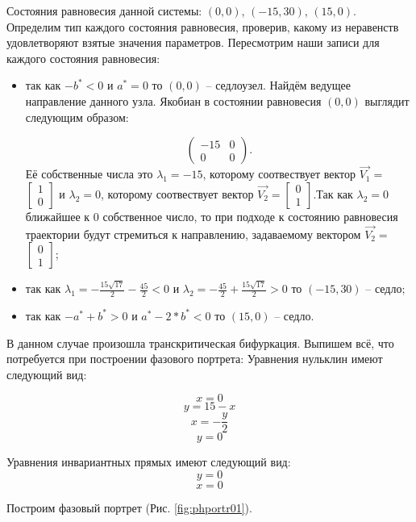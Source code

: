 Состояния равновесия данной системы:  $(0, 0)$, $(-15, 30)$, $(15, 0)$. Определим тип каждого состояния равновесия, проверив, какому из неравенств удовлетворяют взятые значения параметров.  Пересмотрим наши записи для каждого состояния равновесия: 
\begin{itemize}
	\item{ так как $-b^\ast  < 0 $ и $a^\ast = 0 $ то $(0, 0)$ -- седлоузел. Найдём ведущее направление данного узла. Якобиан в состоянии равновесия $(0, 0)$ выглядит следующим образом:
		
		$$\begin{pmatrix}-15 & 0\\0 & 0\end{pmatrix}. $$Её собственные числа это $\lambda_1=-15$, которому соотвествует вектор $\Vec{V_1}=$ $\left[\begin{matrix}1\\0\end{matrix}\right]$ и $\lambda_2=0$, которому соотвествует вектор $\Vec{V_2}=$$\left[\begin{matrix}0\\1\end{matrix}\right]$.Так как $\lambda_2=0$ ближайшее к $0$ собственное число, то при подходе к состоянию равновесия траектории будут стремиться к направлению, задаваемому вектором $\Vec{V_2}=$ $\left[\begin{matrix}0\\1\end{matrix}\right]$;}

	\item{ так как ${\lambda_{1}} = - \frac{15 \sqrt{17}}{2} - \frac{45}{2}$$  < 0 $ и ${\lambda_{2}} = - \frac{45}{2} + \frac{15 \sqrt{17}}{2}$$ > 0 $ то $(-15, 30)$ -- седло;}
	\item{ так как $-a^\ast + b^\ast > 0 $ и $a^\ast - 2*b^\ast  < 0 $ то $(15, 0)$ -- седло.}
\end{itemize} 
В данном случае произошла транскритическая бифуркация. Выпишем всё, что потребуется при построении фазового портрета:
Уравнения нульклин имеют следующий вид: 

$$x=0$$
$$y=15 - x$$
$$x=- \frac{y}{2}$$
$$y=0$$


Уравнения инвариантных прямых имеют следующий вид: 
$$y = 0$$
$$x = 0$$



Построим фазовый портрет (Рис. \ref{fig:phportr01}).

